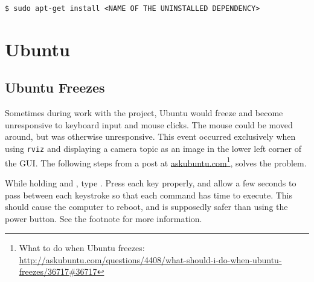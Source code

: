 \begin{verbatim}
$ sudo apt-get install <NAME OF THE UNINSTALLED DEPENDENCY>
\end{verbatim}


\section{Ubuntu}

\subsection{Ubuntu Freezes}

Sometimes during work with the project, Ubuntu would freeze and become unresponsive to keyboard input and mouse clicks. The mouse could be moved around, but was otherwise unresponsive. This event occurred exclusively when using \texttt{rviz} and displaying a camera topic as an image in the lower left corner of the \ac{GUI}. The following steps from a post at \href{http://askubuntu.com/questions/4408/what-should-i-do-when-ubuntu-freezes/36717#36717}{askubuntu.com}\footnote{What to do when Ubuntu freezes: \url{http://askubuntu.com/questions/4408/what-should-i-do-when-ubuntu-freezes/36717\#36717}}, solves the problem.

While holding  and , type . Press each key properly, and allow a few seconds to pass between each keystroke so that each command has time to execute. This should cause the computer to reboot, and is supposedly safer than using the power button. See the footnote for more information.
